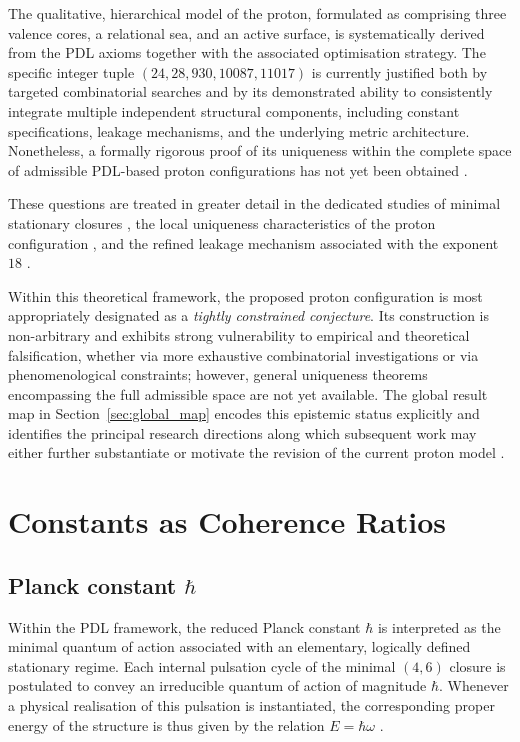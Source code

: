 \documentclass[11pt,a4paper]{article}
\begin{document}
The qualitative, hierarchical model of the proton, formulated as comprising three valence cores, a relational sea, and an active surface, is systematically derived from the PDL axioms together with the associated optimisation strategy. The specific integer tuple \((24,28,930,10087,11017)\) is currently justified both by targeted combinatorial searches and by its demonstrated ability to consistently integrate multiple independent structural components, including constant specifications, leakage mechanisms, and the underlying metric architecture. Nonetheless, a formally rigorous proof of its uniqueness within the complete space of admissible PDL-based proton configurations has not yet been obtained
\citep{Combinatorial_Proton_v2_2026,PDL_position}.

These questions are treated in greater detail in the dedicated studies of minimal stationary closures \citep{Minimal_Stationary_Closures_2026}, the local uniqueness characteristics of the proton configuration \citep{Proton_Local_Uniqueness_2026,Combinatorial_Proton_v2_2026}, and the refined leakage mechanism associated with the exponent \(18\) \citep{Coherence_Leakage_18_2026,Exponent_18_PDL_2026}.

Within this theoretical framework, the proposed proton configuration is most appropriately designated as a \emph{tightly constrained conjecture}. Its construction is non-arbitrary and exhibits strong vulnerability to empirical and theoretical falsification, whether via more exhaustive combinatorial investigations or via phenomenological constraints; however, general uniqueness theorems encompassing the full admissible space are not yet available. The global result map in Section~\ref{sec:global_map} encodes this epistemic status explicitly and identifies the principal research directions along which subsequent work may either further substantiate or motivate the revision of the current proton model \citep{PDL_position}.

\section{Constants as Coherence Ratios}
\label{sec:constants}

\subsection{Planck constant \texorpdfstring{\(\hbar\)}{hbar}}
\label{subsec:hbar}

Within the PDL framework, the reduced Planck constant \(\hbar\) is interpreted as the minimal quantum of action associated with an elementary, logically defined stationary regime. Each internal pulsation cycle of the minimal \((4,6)\) closure is postulated to convey an irreducible quantum of action of magnitude \(\hbar\). Whenever a physical realisation of this pulsation is instantiated, the corresponding proper energy of the structure is thus given by the relation \(E = \hbar \omega\)
\citep{PDL_Main_2026,PDL_intro}.
\end{document}
